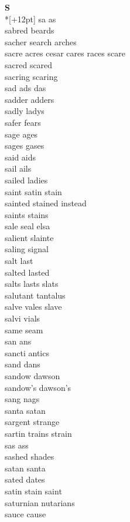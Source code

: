 \vspace{14pt}
\noindent\textbf{\Large S}\\*[+12pt]
sa as\\
sabred beards\\
sacher search arches\\
sacre acres cesar cares races scare\\
sacred scared\\
sacring scaring\\
sad ads das\\
sadder adders\\
sadly ladys\\
safer fears\\
sage ages\\
sages gases\\
said aids\\
sail ails\\
sailed ladies\\
saint satin stain\\
sainted stained instead\\
saints stains\\
sale seal elsa\\
salient slainte\\
saling signal\\
salt last\\
salted lasted\\
salts lasts slats\\
salutant tantalus\\
salve vales slave\\
salvi vials\\
same seam\\
san ans\\
sancti antics\\
sand dans\\
sandow dawson\\
sandow's dawson's\\
sang nags\\
santa satan\\
sargent strange\\
sartin trains strain\\
sas ass\\
sashed shades\\
satan santa\\
sated dates\\
satin stain saint\\
saturnian nutarians\\
sauce cause\\
